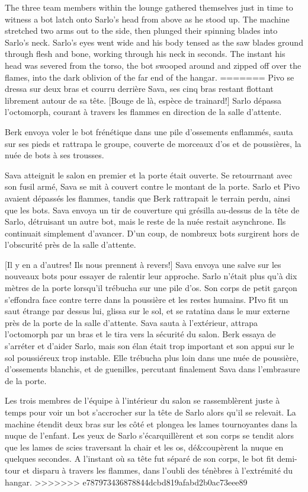The three team members within the lounge gathered themselves just in time to witness a bot latch onto Sarlo's head from above as he stood up. The machine stretched two arms out to the side, then plunged their spinning blades into Sarlo's neck. Sarlo's eyes went wide and his body tensed as the saw blades ground through flesh and bone, working through his neck in seconds. The instant his head was severed from the torso, the bot swooped around and zipped off over the flames, into the dark oblivion of the far end of the hangar. 
=======
Pivo se dressa sur deux bras et courru derrière Sava, ses cinq bras restant flottant librement autour de sa tête. [Bouge de là, espèce de trainard!] Sarlo dépassa l'octomorph, courant à travers les flammes en direction de la salle d'attente. 

Berk envoya voler le bot frénétique dans une pile d'ossements enflammés, sauta sur ses pieds et rattrapa le groupe, couverte de morceaux d'os et de poussières, la nuée de bots à ses trousses. 

Sava atteignit le salon en premier et la porte était ouverte. Se retourrnant avec son fusil armé, Sava se mit à couvert contre le montant de la porte. Sarlo et Pivo avaient dépassés les flammes, tandis que Berk rattrapait le terrain perdu, ainsi que les bots. Sava envoya un tir de couverture qui grésilla au-dessus de la tête de Sarlo, détruisant un autre bot, mais le reste de la nuée restait asynchrone. Ils continuait simplement d'avancer. D'un coup, de nombreux bots surgirent hors de l'obscurité près de la salle d'attente. 

[Il y en a d'autres! Ils nous prennent à revers!] Sava envoya une salve sur les nouveaux bots pour essayer de ralentir leur approche. Sarlo n'était plus qu'à dix mètres de la porte lorsqu'il trébucha sur une pile d'os. Son corps de petit garçon s'effondra face contre terre dans la poussière et les restes humains. PIvo fit un saut étrange par dessus lui, glissa sur le sol, et se ratatina dans le mur externe près de la porte de la salle d'attente. Sava sauta à l'extérieur, attrapa l'octomorph par un bras et le tira vers la sécurité du salon. Berk essaya de s'arréter et d'aider Sarlo, mais son élan était trop important et son appui sur le sol poussiéreux trop instable. Elle trébucha plus loin dans une nuée de poussière, d'ossements blanchis, et de guenilles, percutant finalement Sava dans l'embrasure de la porte. 

Les trois membres de l'équipe à l'intérieur du salon se rassemblèrent juste à temps pour voir un bot s'accrocher sur la tête de Sarlo alors qu'il se relevait. La machine étendit deux bras sur les côté et plongea les lames tournoyantes dans la nuque de l'enfant. Les yeux de Sarlo s'écarquillèrent et son corps se tendit alors que les lames de scies traversant la chair et les os, dé&coupèrent la nuque en quelques secondes. A l'instant où sa tête fut séparé de son corps, le bot fit demi-tour et disparu à travers les flammes, dans l'oubli des ténèbres à l'extrémité du hangar. 
>>>>>>> e787973436878844dcbd819afabd2b0ac73eee89


